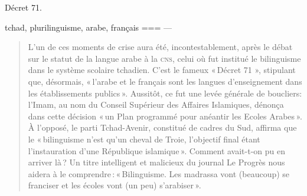 Décret 71.

tchad, plurilinguisme, arabe, français
===
\textcite{coudray}---
\begin{quote}    
L’un de ces moments de crise aura été, incontestablement, après le débat sur le statut de la langue arabe à la \textsc{cns}, celui où fut institué le bilinguisme dans le système scolaire tchadien. C’est le fameux « Décret 71 », stipulant que, désormais, « l’arabe et le français sont les langues d’enseignement dans les établissements publics ». Aussitôt, ce fut une levée générale de boucliers: l’Imam, au nom du Conseil Supérieur des Affaires Islamiques, dénonça dans cette décision « un Plan programmé pour anéantir les Ecoles Arabes ». À l’opposé, le parti Tchad-Avenir, constitué de cadres du Sud, affirma que le « bilinguisme n’est qu’un cheval de Troie, l’objectif final étant l’instauration d’une République islamique ». Comment avait-t-on pu en arriver là ? Un titre intelligent et malicieux du journal Le Progrès nous aidera à le comprendre : « Bilinguisme. Les madrassa vont (beaucoup) se franciser et les écoles vont (un peu) s’arabiser ».
\end{quote}